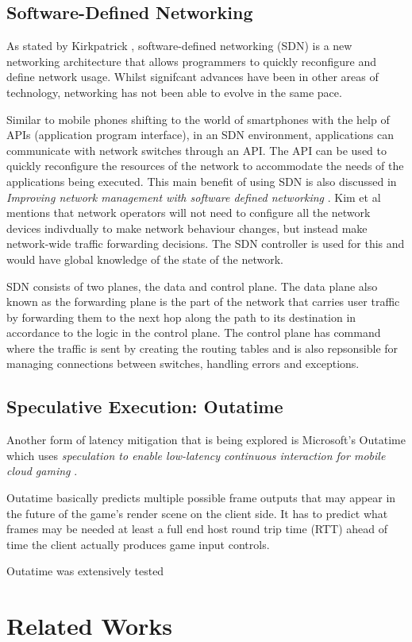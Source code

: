 \subsection{Software-Defined Networking}
As stated by Kirkpatrick \cite{kirkpatrick2013software}, software-defined networking (SDN) is a new networking architecture that allows programmers to quickly reconfigure and define network usage. Whilst signifcant advances have been in other areas of technology, networking has not been able to evolve in the same pace.
\newline
\par
Similar to mobile phones shifting to the world of smartphones with the help of APIs (application program interface), in an SDN environment, applications can communicate with network switches through an API. The API can be used to quickly reconfigure the resources of the network to accommodate the needs of the applications being executed. This main benefit of using SDN is also discussed in \textit{Improving network management with software defined networking} \cite{kim2013improving}. Kim et al mentions that network operators will not need to configure all the network devices indivdually to make network behaviour changes, but instead make network-wide traffic forwarding decisions. The SDN controller is used for this and would have global knowledge of the state of the network.
\newline
\par
SDN consists of two planes, the data and control plane. The data plane also known as the forwarding plane is the part of the network that carries user traffic by forwarding them to the next hop along the path to its destination in accordance to the logic in the control plane. The control plane has command where the traffic is sent by creating the routing tables and is also repsonsible for managing connections between switches, handling errors and exceptions.

\subsection{Speculative Execution: Outatime}
Another form of latency mitigation that is being explored is Microsoft's Outatime which uses \textit{speculation to enable low-latency continuous interaction for mobile cloud gaming} \cite{lee2015outatime}.
\newline 
\par
Outatime basically predicts multiple possible frame outputs that may appear in the future of the game's render scene on the client side. It has to predict what frames may be needed at least a full end host round trip time (RTT) ahead of time the client actually produces game input controls.
\newline
\par
Outatime was extensively tested

\section{Related Works}
\lipsum[1-1]